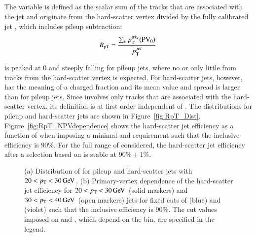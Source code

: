 \documentclass{atlasnote}
\begin{document}
\subsection{\RpT}
The variable \RpT is defined as the scalar \pT sum of the tracks that are associated with the jet and 
originate from the hard-scatter vertex divided by the fully calibrated jet \pT, which includes pileup subtraction:
\begin{equation}
R_\mathrm{pT} = \frac{\sum_k{p_{\mathrm{T}}^{{\rm trk}_k}({\rm PV}_0)}}{p_{\mathrm{T}}^{jet}}.
\label{eq:RpT}
\end{equation}

\RpT is peaked at 0 and steeply falling for pileup jets, where no or only little \pT from tracks from the hard-scatter vertex is expected. 
For hard-scatter jets, however, \RpT has the meaning of a charged \pT fraction and its mean value and spread is larger than for pileup jets. Since 
\RpT involves only tracks that are associated with the hard-scatter vertex, its definition is at first order independent of \NPV.
The \RpT  distributions for pileup and hard-scatter jets are shown in Figure~\ref{fig:RpT_Dist}.
Figure~\ref{fig:RpT_NPVdependence} 
shows the hard-scatter jet efficiency as a function of \NPV 
when imposing a minimal \RpT and \JVF 
requirement such that the \NPV inclusive efficiency is $90\%$. 
For the full range of \NPV considered, the hard-scatter jet efficiency after a selection based on \RpT 
is stable at $90\%\pm1\%$.
\begin{figure}[!htbp]
  \centering
  \caption{(a) Distribution of \RpT for pileup and hard-scatter jets with $20 < p_{\mathrm{T}} < 30\,\text{Ge\hspace{-.08em}V}$. 
           (b) Primary-vertex dependence of the hard-scatter 
           jet efficiency for $20 < p_{\mathrm{T}} < 30\,\text{Ge\hspace{-.08em}V}$ (solid markers) and $30 < p_{\mathrm{T}} < 40\,\text{Ge\hspace{-.08em}V}$ (open markers) 
           jets for fixed cuts of \RpT (blue) and \JVF (violet) such that the inclusive efficiency is $90\%$.
           The cut values imposed on \RpT and \JVF, which depend on the \pT bin, are specified in the legend.}

\label{fig:RpT}
\end{figure}
\end{document}
